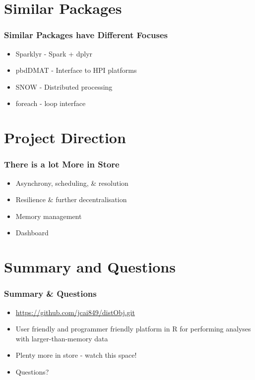 \documentclass[handout]{beamer}
\begin{document}
\section{Similar Packages}
	\begin{frame}
		\frametitle{Similar Packages have Different Focuses}
		\begin{itemize}
			\item Sparklyr - Spark + dplyr
			\item pbdDMAT - Interface to HPI platforms
			\item SNOW - Distributed processing
			\item foreach - loop interface
		\end{itemize}
	\end{frame}
\section{Project Direction}
	\begin{frame}
		\frametitle{There is a lot More in Store}
		\begin{itemize}
			\item Asynchrony, scheduling, \& resolution
			\item Resilience \& further decentralisation
			\item Memory management
			\item Dashboard
		\end{itemize}
	\end{frame}
\section{Summary and Questions}
	\begin{frame}
		\frametitle{Summary \& Questions}
		\begin{itemize}
			\item \url{https://github.com/jcai849/distObj.git}
			\item User friendly and programmer friendly platform in
				R for performing analyses with
				larger-than-memory data
			\item Plenty more in store - watch this space!
			\item Questions?
		\end{itemize}
	\end{frame}
\end{document}
